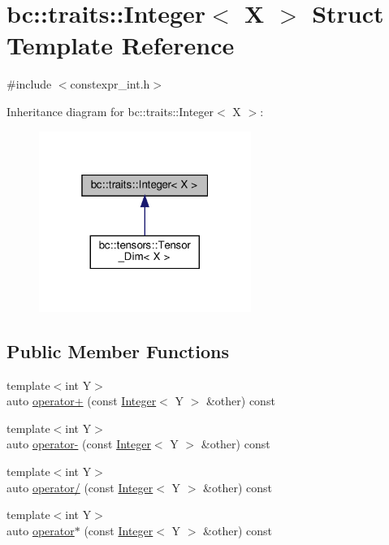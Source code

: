 \hypertarget{structbc_1_1traits_1_1Integer}{}\section{bc\+:\+:traits\+:\+:Integer$<$ X $>$ Struct Template Reference}
\label{structbc_1_1traits_1_1Integer}


{\ttfamily \#include $<$constexpr\+\_\+int.\+h$>$}



Inheritance diagram for bc\+:\+:traits\+:\+:Integer$<$ X $>$\+:\nopagebreak
\begin{figure}[H]
\begin{center}
\leavevmode
\includegraphics[width=196pt]{structbc_1_1traits_1_1Integer__inherit__graph}
\end{center}
\end{figure}
\subsection*{Public Member Functions}
\begin{DoxyCompactItemize}
\item 
{\footnotesize template$<$int Y$>$ }\\auto \hyperlink{structbc_1_1traits_1_1Integer_adf0914fdfb886dae697c578fda4fd4a3}{operator+} (const \hyperlink{structbc_1_1traits_1_1Integer}{Integer}$<$ Y $>$ \&other) const
\item 
{\footnotesize template$<$int Y$>$ }\\auto \hyperlink{structbc_1_1traits_1_1Integer_aa240f8d636f107e7acf4682855bc377e}{operator-\/} (const \hyperlink{structbc_1_1traits_1_1Integer}{Integer}$<$ Y $>$ \&other) const
\item 
{\footnotesize template$<$int Y$>$ }\\auto \hyperlink{structbc_1_1traits_1_1Integer_a8358e03217a8556e1b9094641fec4d3a}{operator/} (const \hyperlink{structbc_1_1traits_1_1Integer}{Integer}$<$ Y $>$ \&other) const
\item 
{\footnotesize template$<$int Y$>$ }\\auto \hyperlink{structbc_1_1traits_1_1Integer_a44718761db2de064ee58fb8b0da41468}{operator$\ast$} (const \hyperlink{structbc_1_1traits_1_1Integer}{Integer}$<$ Y $>$ \&other) const
\end{DoxyCompactItemize}
